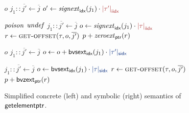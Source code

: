 \begin{figure}[t]
\centering

\begin{minipage}[t]{0.49\textwidth}
\vspace{0pt}
\small
\begin{algorithmic}[1]

        \State \Return $o$
    \EndIf
    \State $j_1 :: \overline{j'} \gets \overline{j}$
        \State $o' \gets \signext{\indexwidth}{j_1} \cdot \valoftype{|\tau'|}{\indextype}$ \label{line:gep:array-index}
        \State \Return {}
    \EndIf
\EndFunction

        \State \Return $\mathit{poison}$
    \EndIf
        \State \Return $\mathit{undef}$
    \EndIf
    \State $j_1 :: \overline{j'} \gets \overline{j}$
    \State $o \gets \signext{\indexwidth}{j_1} \cdot \valoftype{|\tau|}{\indextype}$ \label{line:gep:first-index}
    \State $r \gets \Call{get-offset}{\tau, o, \overline{j'}}$
    \State \Return $p + \mathit{zeroext}_{\textsf{ptr}}(r)$ \label{line:gep:add-offset}
\EndFunction

\end{algorithmic}
\end{minipage}
\hfill
\begin{minipage}[t]{0.49\textwidth}
\vspace{0pt}
\small
\begin{algorithmic}[1]

        \State \Return $o$
    \EndIf
    \State $j_1 :: \overline{j'} \gets \overline{j}$
        \State $o \gets \bvadd{\bvsort{\indexwidth}}{o}{\bvmul{\bvsort{\indexwidth}}{\bvsext{\indexwidth}{j_1}}{\bvconst{\indexwidth}{|\tau'|}}}$ \label{line:array-index}
        \State \Return {}
    \EndIf
\EndFunction

    \State $j_1 :: \overline{j'} \gets \overline{j}$
    \State $o \gets \bvmul{\bvsort{\indexwidth}}{\bvsext{\indexwidth}{j_1}}{\bvconst{\indexwidth}{|\tau|}}$ \label{line:first-index}
    \State $r \gets \Call{get-offset}{\tau, o, \overline{j'}}$
    \State \Return $p + \textsf{bvzext}_{\textsf{ptr}}(r)$
\EndFunction

\end{algorithmic}
\end{minipage}
\caption{Simplified concrete (left) and symbolic (right) semantics of $\textsf{getelementptr}$.}
\label{alg:gep-all}

\end{figure}
